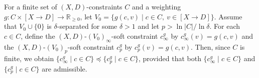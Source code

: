 \documentclass[english]{notes}
\newcommand{\RZ}{\mathbb{R}}
\newcommand{\RZp}{\RZ_{\geq 0}}
\begin{document}
For a finite set of $(X, D)$-constraints $C$ and a weighting
$g : C \times [X \to D] \to \RZp$, let
$V_0 = \{ g(c, v) \mid c \in C,\ v \in [X \to D] \}$.  Assume that
$V_0 \cup \{ 0 \}$ is $\delta$-separated for some $\delta > 1$ and let
$p > \ln |C|/\ln \delta$.  For each $c \in C$, define the
$(X, D)$-$(V_0)_{\infty}$-soft constraint $c_{\infty}^g$ by
$c_{\infty}^g(v) = g(c, v)$ and the $(X, D)$-$(V_0)_{p}$-soft
constraint $c_p^g$ by $c_p^g(v) = g(c, v)$.  Then, since $C$ is
finite, we obtain
$\{ c_{\infty}^g \mid c \in C \} \preccurlyeq \{ c_p^g \mid c \in C
\}$,
provided that both $\{ c_{\infty}^g \mid c \in C \}$ and
$\{ c_p^g \mid c \in C \}$ are admissible.




\end{document}
